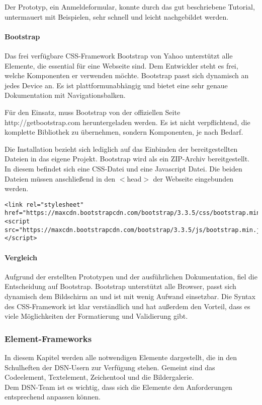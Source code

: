 Der Prototyp, ein Anmeldeformular, konnte durch das gut beschriebene Tutorial, untermauert mit Beispielen, sehr schnell und leicht nachgebildet werden.

\paragraph{Bootstrap}
Das frei verfügbare CSS-Framework Bootstrap von Yahoo unterstützt alle Elemente, die essential für eine Webseite sind. Dem Entwickler steht es frei, welche Komponenten er verwenden möchte. Bootstrap passt sich dynamisch an jedes Device an. Es ist plattformunabhängig und bietet eine sehr genaue Dokumentation mit Navigationsbalken.

Für den Einsatz, muss Bootstrap von der offiziellen Seite http://getbootstrap.com heruntergeladen werden. Es ist nicht verpflichtend, die komplette Bibliothek zu übernehmen, sondern Komponenten, je nach Bedarf.
 
Die Installation bezieht sich lediglich auf das Einbinden der bereitgestellten Dateien in das eigene Projekt. Bootstrap wird als ein ZIP-Archiv bereitgestellt. In diesem befindet sich eine CSS-Datei und eine Javascript Datei. Die beiden Dateien müssen anschließend in den $<$head$>$ der Webseite eingebunden werden. \cite{BOOTSTRAP}
\begin{lstlisting}[caption={Bootstrap einbinden \cite{BOOTSTRAP}}]
<link rel="stylesheet"
href="https://maxcdn.bootstrapcdn.com/bootstrap/3.3.5/css/bootstrap.min.css">
<script src="https://maxcdn.bootstrapcdn.com/bootstrap/3.3.5/js/bootstrap.min.js">
</script>
\end{lstlisting}

\paragraph{Vergleich}
Aufgrund der erstellten Prototypen und der ausführlichen Dokumentation, fiel die Entscheidung auf Bootstrap. Bootstrap unterstützt alle Browser, passt sich dynamisch dem Bildschirm an und ist mit wenig Aufwand einsetzbar. Die Syntax des CSS-Framework ist klar verständlich und hat außerdem den Vorteil, dass es viele Möglichkeiten der Formatierung und Validierung gibt.

\subsubsection{Element-Frameworks}
In diesem Kapitel werden alle notwendigen Elemente dargestellt, die in den Schulheften der DSN-Usern zur Verfügung stehen. Gemeint sind das Codeelement, Textelement, Zeichentool und die Bildergalerie.\\
Dem DSN-Team ist es wichtig, dass sich die Elemente den Anforderungen entsprechend anpassen können.

